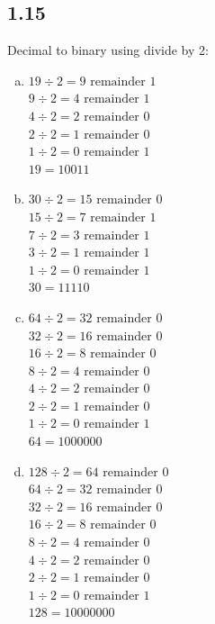 \documentclass{article}
\begin{document}
\subsection*{1.15}
Decimal to binary using divide by 2:
\begin{enumerate}[(a)]
    \item 
    $19 \div 2 = 9 \text{ remainder } 1$ \\
    $9 \div 2 = 4 \text{ remainder } 1$ \\
    $4 \div 2 = 2 \text{ remainder } 0$ \\
    $2 \div 2 = 1 \text{ remainder } 0$ \\
    $1 \div 2 = 0 \text{ remainder } 1$ \\
    $19 = 10011$
    \item 
    $30 \div 2 = 15 \text{ remainder } 0$ \\
    $15 \div 2 = 7 \text{ remainder } 1$ \\
    $7 \div 2 = 3 \text{ remainder } 1$ \\
    $3 \div 2 = 1 \text{ remainder } 1$ \\
    $1 \div 2 = 0 \text{ remainder } 1$ \\
    $30 = 11110$
    \item 
    $64 \div 2 = 32 \text{ remainder } 0$ \\
    $32 \div 2 = 16 \text{ remainder } 0$ \\
    $16 \div 2 = 8 \text{ remainder } 0$ \\
    $8 \div 2 = 4 \text{ remainder } 0$ \\
    $4 \div 2 = 2 \text{ remainder } 0$ \\
    $2 \div 2 = 1 \text{ remainder } 0$ \\
    $1 \div 2 = 0 \text{ remainder } 1$ \\
    $64 = 1000000$
    \newpage
    \item 
    $128 \div 2 = 64 \text{ remainder } 0$ \\
    $64 \div 2 = 32 \text{ remainder } 0$ \\
    $32 \div 2 = 16 \text{ remainder } 0$ \\
    $16 \div 2 = 8 \text{ remainder } 0$ \\
    $8 \div 2 = 4 \text{ remainder } 0$ \\
    $4 \div 2 = 2 \text{ remainder } 0$ \\
    $2 \div 2 = 1 \text{ remainder } 0$ \\
    $1 \div 2 = 0 \text{ remainder } 1$ \\
    $128 = 10000000$
\end{enumerate}
\end{document}
